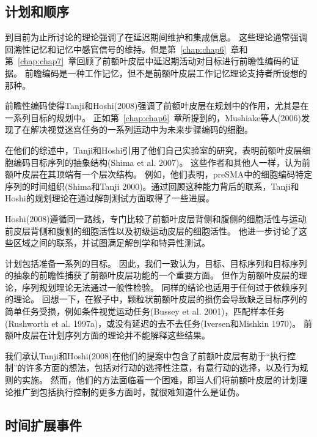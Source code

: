 \subsection{计划和顺序}

到目前为止所讨论的理论强调了在延迟期间维护和集成信息。
这些理论通常强调回溯性记忆和记忆中感官信号的维持。但是第~\ref{chap:chap6}~章和第~\ref{chap:chap7}~章回顾了前额叶皮层中延迟期活动对目标进行前瞻性编码的证据。
前瞻编码是一种工作记忆，但不是前额叶皮层工作记忆理论支持者所设想的那种。
\par


前瞻性编码使得Tanji和Hoshi(2008)强调了前额叶皮层在规划中的作用，尤其是在一系列目标的规划中。
正如第~\ref{chap:chap6}~章所提到的，Mushiake等人(2006)发现了在解决视觉迷宫任务的一系列运动中为未来步骤编码的细胞。
\par


在他们的综述中，Tanji和Hoshi引用了他们自己实验室的研究，表明前额叶皮层细胞编码目标序列的抽象结构(Shima et al. 2007)。
这些作者和其他人一样，认为前额叶皮层在其顶端有一个层次结构。
例如，他们表明，preSMA中的细胞编码特定序列的时间组织(Shima和Tanji 2000)。通过回顾这种能力背后的联系，Tanji和Hoshi的规划理论在通过解剖测试方面取得了一些进展。
\par


Hoshi(2008)遵循同一路线，专门比较了前额叶皮层背侧和腹侧的细胞活性与运动前皮层背侧和腹侧的细胞活性以及初级运动皮层的细胞活性。
他进一步讨论了这些区域之间的联系，并试图满足解剖学和特异性测试。
\par


计划包括准备一系列的目标。
因此，我们一致认为，目标、目标序列和目标序列的抽象的前瞻性捕获了前额叶皮层功能的一个重要方面。
但作为前额叶皮层的理论，序列规划理论无法通过一般性检验。
同样的结论也适用于任何过于依赖序列的理论。
回想一下，在猴子中，颗粒状前额叶皮层的损伤会导致缺乏目标序列的简单任务受损，例如条件视觉运动任务(Bussey et al. 2001)，匹配样本任务(Rushworth et al. 1997a)，或没有延迟的去不去任务(Iversen和Mishkin 1970)。
前额叶皮层在计划序列方面的理论并不能解释这些结果。
\par


我们承认Tanji和Hoshi(2008)在他们的提案中包含了前额叶皮层有助于“执行控制”的许多方面的想法，包括对行动的选择性注意，有意行动的选择，以及行为规则的实施。
然而，他们的方法面临着一个困难，即当人们将前额叶皮层的计划理论推广到包括执行控制的更多方面时，就很难知道什么是证伪。



\subsection{时间扩展事件}

